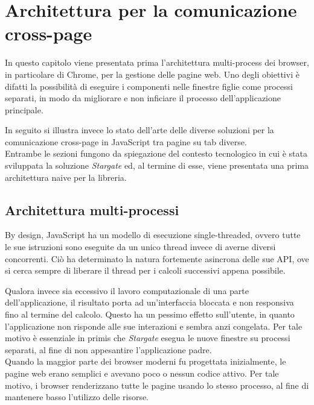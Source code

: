 
\chapter{Architettura per la comunicazione cross-page}
\label{cap:architettura}

In questo capitolo viene presentata prima l'architettura multi-process dei browser, in particolare di Chrome, per la gestione delle pagine web. Uno degli obiettivi è difatti la possibilità di eseguire i componenti nelle finestre figlie come processi separati, in modo da migliorare e non inficiare il processo dell'applicazione principale.

In seguito si illustra invece lo stato dell'arte delle diverse soluzioni per la comunicazione cross-page in JavaScript tra pagine su tab diverse. \\

Entrambe le sezioni fungono da spiegazione del contesto tecnologico in cui è stata sviluppata la soluzione \textit{Stargate} ed, al termine di esse, viene presentata una prima architettura naive per la libreria.

\section{Architettura multi-processi}

By design, JavaScript ha un modello di esecuzione single-threaded, ovvero tutte le sue istruzioni sono eseguite da un unico thread invece di averne diversi concorrenti. Ciò ha determinato la natura fortemente asincrona delle sue API, ove si cerca sempre di liberare il thread per i calcoli successivi appena possibile.

Qualora invece sia eccessivo il lavoro computazionale di una parte dell'applicazione, il risultato porta ad un'interfaccia bloccata e non responsiva fino al termine del calcolo. Questo ha un pessimo effetto sull'utente, in quanto l'applicazione non risponde alle sue interazioni e sembra anzi congelata. Per tale motivo è essenziale in primis che \textit{Stargate} esegua le nuove finestre su processi separati, al fine di non appesantire l'applicazione padre. \\

Quando la maggior parte dei browser moderni fu progettata inizialmente, le pagine web erano semplici e avevano poco o nessun codice attivo. Per tale motivo, i browser renderizzano tutte le pagine usando lo stesso processo, al fine di mantenere basso l'utilizzo delle risorse. \\

